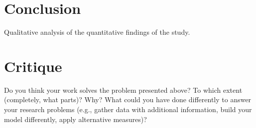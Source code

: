 \documentclass[12pt, a4paper]{article}
\begin{document}
\section{Conclusion}
\label{conclusion}

Qualitative analysis of the quantitative findings of the study.

\section{Critique}
\label{critique}

Do you think your work solves the problem presented above? To which
extent (completely, what parts)? Why? What could you have done
differently to answer your research problems (e.g., gather data with
additional information, build your model differently, apply alternative
measures)?
\end{document}
